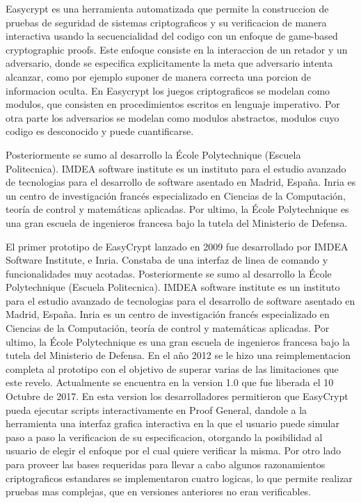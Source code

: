 \documentclass[runningheads]{llncs}
\begin{document}
Easycrypt es una herramienta automatizada que permite la construccion de pruebas de seguridad de sistemas criptograficos y su verificacion de manera interactiva usando la secuencialidad del codigo con un enfoque de game-based cryptographic proofs. Este enfoque consiste en la interaccion de un retador y un adversario, donde se especifica explicitamente la meta que adversario intenta alcanzar, como por ejemplo suponer de manera correcta una porcion de informacion oculta. En Easycrypt los juegos criptograficos se modelan como modulos, que consisten en procedimientos escritos en lenguaje imperativo. Por otra parte los adversarios se modelan como modulos abstractos, modulos cuyo codigo es desconocido y puede cuantificarse.

 Posteriormente se sumo al desarrollo la École Polytechnique (Escuela Politecnica). IMDEA software institute es un instituto para el estudio avanzado de tecnologias para el desarrollo de software asentado en Madrid, España. Inria es un centro de investigación francés especializado en Ciencias de la Computación, teoría de control y matemáticas aplicadas. Por ultimo, la École Polytechnique es una gran escuela de ingenieros francesa bajo la tutela del Ministerio de Defensa.

El primer prototipo de EasyCrypt lanzado en 2009 fue desarrollado por IMDEA Software Institute, e Inria. Constaba de una interfaz de linea de comando y funcionalidades muy acotadas. Posteriormente se sumo al desarrollo la École Polytechnique (Escuela Politecnica). IMDEA software institute es un instituto para el estudio avanzado de tecnologias para el desarrollo de software asentado en Madrid, España. Inria es un centro de investigación francés especializado en Ciencias de la Computación, teoría de control y matemáticas aplicadas. Por ultimo, la École Polytechnique es una gran escuela de ingenieros francesa bajo la tutela del Ministerio de Defensa. En el año 2012 se le hizo una reimplementacion completa al prototipo con el objetivo de superar varias de las limitaciones que este revelo. Actualmente se encuentra en la version 1.0 que fue liberada el 10 Octubre de 2017. En esta version los desarrolladores permitieron que EasyCrypt pueda ejecutar scripts interactivamente en Proof General\cite{ref_webpage2}, dandole a la herramienta una interfaz grafica interactiva en la que el usuario puede simular paso a paso la verificacion de su especificacion, otorgando la posibilidad al usuario de elegir el enfoque por el cual quiere verificar la misma. Por otro lado para proveer las bases requeridas para llevar a cabo algunos razonamientos criptograficos estandares se implementaron cuatro logicas, lo que permite realizar pruebas mas complejas, que en versiones anteriores no eran verificables.
\end{document}
